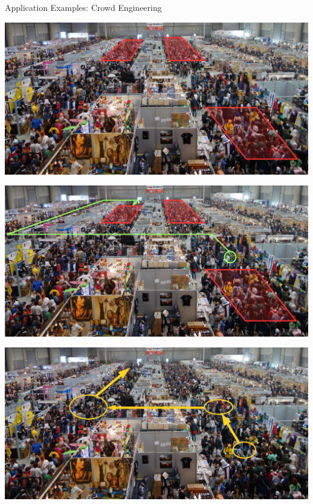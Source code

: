 \documentclass[8pt, aspectratio=169, handout]{beamer}
\begin{document}
\begin{frame}{Application Examples: Crowd Engineering}
  \begin{multicols*}{3}
    \begin{card}
      \includegraphics[width=\textwidth]{img/crowd-detection.png}
    \end{card}
    \begin{card}
      \includegraphics[width=\textwidth]{img/crowd-steering.png}
    \end{card}
    \begin{card}
      \includegraphics[width=\textwidth]{img/contact-tracing.png}
    \end{card}
    
  \end{multicols*}
\end{frame}
\end{document}
